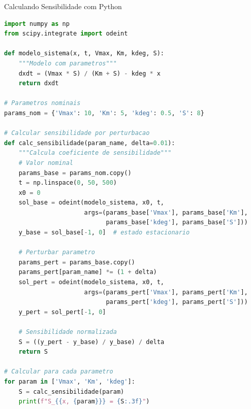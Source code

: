 \begin{frame}{Calculando Sensibilidade com Python}
\begin{lstlisting}[language=Python, basicstyle=\ttfamily\footnotesize]
import numpy as np
from scipy.integrate import odeint

def modelo_sistema(x, t, Vmax, Km, kdeg, S):
    """Modelo com parametros"""
    dxdt = (Vmax * S) / (Km + S) - kdeg * x
    return dxdt

# Parametros nominais
params_nom = {'Vmax': 10, 'Km': 5, 'kdeg': 0.5, 'S': 8}

# Calcular sensibilidade por perturbacao
def calc_sensibilidade(param_name, delta=0.01):
    """Calcula coeficiente de sensibilidade"""
    # Valor nominal
    params_base = params_nom.copy()
    t = np.linspace(0, 50, 500)
    x0 = 0
    sol_base = odeint(modelo_sistema, x0, t,
                      args=(params_base['Vmax'], params_base['Km'],
                            params_base['kdeg'], params_base['S']))
    y_base = sol_base[-1, 0]  # estado estacionario

    # Perturbar parametro
    params_pert = params_base.copy()
    params_pert[param_name] *= (1 + delta)
    sol_pert = odeint(modelo_sistema, x0, t,
                      args=(params_pert['Vmax'], params_pert['Km'],
                            params_pert['kdeg'], params_pert['S']))
    y_pert = sol_pert[-1, 0]

    # Sensibilidade normalizada
    S = ((y_pert - y_base) / y_base) / delta
    return S

# Calcular para cada parametro
for param in ['Vmax', 'Km', 'kdeg']:
    S = calc_sensibilidade(param)
    print(f"S_{{x, {param}}} = {S:.3f}")
\end{lstlisting}
\end{frame}

